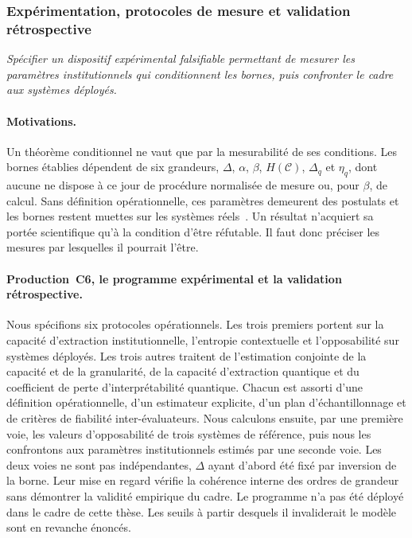 \subsubsection{Exp\'erimentation, protocoles de mesure et validation r\'etrospective}
\label{subsubsec:obj6_experimentation}
\begin{sloppypar}

\begin{objectif}\label{obj:obj6_experimentation}
\textit{Sp\'ecifier un dispositif exp\'erimental falsifiable permettant de mesurer les param\`etres institutionnels qui conditionnent les bornes, puis confronter le cadre aux syst\`emes d\'eploy\'es.}
\end{objectif}

\paragraph{Motivations.}
Un th\'eor\`eme conditionnel ne vaut que par la mesurabilit\'e de ses
conditions. Les bornes \'etablies d\'ependent de six grandeurs,
$\Delta$, $\alpha$, $\beta$, $H(\mathcal{C})$, $\Delta_q$ et $\eta_q$, dont
aucune ne dispose \`a ce jour de proc\'edure normalis\'ee de mesure ou, pour $\beta$, de calcul. Sans
d\'efinition op\'erationnelle, ces param\`etres demeurent des postulats et
les bornes restent muettes sur les syst\`emes r\'eels~\cite{Popper1934}. Un
r\'esultat n'acquiert sa port\'ee scientifique qu'\`a la condition d'\^etre
r\'efutable. Il faut donc pr\'eciser les mesures par lesquelles il pourrait l'\^etre.

\paragraph{Production~C6, le programme exp\'erimental et la validation r\'etrospective.}
Nous sp\'ecifions six protocoles op\'erationnels. Les trois premiers portent
sur la capacit\'e d'extraction institutionnelle, l'entropie contextuelle
et l'opposabilit\'e sur syst\`emes d\'eploy\'es. Les trois autres traitent de l'estimation conjointe de la
capacit\'e et de la granularit\'e, de la capacit\'e d'extraction quantique et du
coefficient de perte d'interpr\'etabilit\'e quantique. Chacun est assorti d'une
d\'efinition op\'erationnelle, d'un estimateur explicite, d'un plan
d'\'echantillonnage et de crit\`eres de fiabilit\'e inter-\'evaluateurs. Nous calculons
ensuite, par une premi\`ere voie, les valeurs d'opposabilit\'e de trois
syst\`emes de r\'ef\'erence, puis nous les confrontons aux param\`etres
institutionnels estim\'es par une seconde voie. Les deux voies ne sont pas
ind\'ependantes, $\Delta$ ayant d'abord \'et\'e fix\'e par inversion de la borne. Leur mise en regard
v\'erifie la coh\'erence interne des ordres de grandeur sans d\'emontrer la validit\'e empirique du cadre. Le programme n'a pas \'et\'e d\'eploy\'e dans le
cadre de cette th\`ese. Les seuils \`a partir desquels il invaliderait
le mod\`ele sont en revanche \'enonc\'es.


\end{sloppypar}
